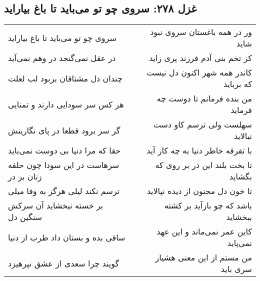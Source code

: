 \begin{center}
\section*{غزل ۲۷۸: سروی چو تو می‌باید تا باغ بیاراید}
\label{sec:278}
\begin{longtable}{l p{0.5cm} r}
سروی چو تو می‌باید تا باغ بیاراید
&&
ور در همه باغستان سروی نبود شاید
\\
در عقل نمی‌گنجد در وهم نمی‌آید
&&
کز تخم بنی آدم فرزند پری زاید
\\
چندان دل مشتاقان بربود لب لعلت
&&
کاندر همه شهر اکنون دل نیست که برباید
\\
هر کس سر سودایی دارند و تمنایی
&&
من بنده فرمانم تا دوست چه فرماید
\\
گر سر برود قطعا در پای نگارینش
&&
سهلست ولی ترسم کاو دست نیالاید
\\
حقا که مرا دنیا بی دوست نمی‌باید
&&
با تفرقه خاطر دنیا به چه کار آید
\\
سرهاست در این سودا چون حلقه زنان بر در
&&
تا بخت بلند این در بر روی که بگشاید
\\
ترسم نکند لیلی هرگز به وفا میلی
&&
تا خون دل مجنون از دیده نپالاید
\\
بر خسته نبخشاید آن سرکش سنگین دل
&&
باشد که چو بازآید بر کشته ببخشاید
\\
ساقی بده و بستان داد طرب از دنیا
&&
کاین عمر نمی‌ماند و این عهد نمی‌پاید
\\
گویند چرا سعدی از عشق نپرهیزد
&&
من مستم از این معنی هشیار سری باید
\\
\end{longtable}
\end{center}
